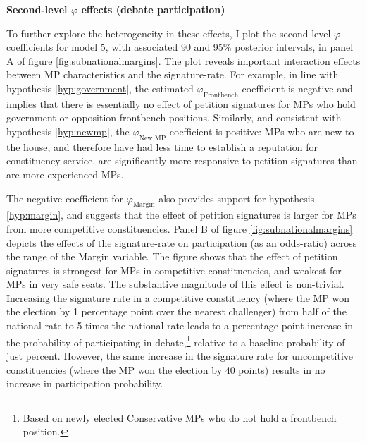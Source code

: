 \documentclass[12pt]{article}
\begin{document}
\begin{table}

\begin{center}



\end{center}
\caption{\label{tab:part_results}\textbf{Second-level $\varphi$ effects (debate participation)} }

\end{table}


To further explore the heterogeneity in these effects, I plot the second-level $\varphi$ coefficients for model 5, with associated 90 and 95\% posterior intervals, in panel A of figure \ref{fig:subnationalmargins}. The plot reveals important interaction effects between MP characteristics and the signature-rate. For example, in line with hypothesis \ref{hyp:government}, the estimated $\varphi_\text{Frontbench}$ coefficient is negative and implies that there is essentially no effect of petition signatures for MPs who hold government or opposition frontbench positions. Similarly, and consistent with hypothesis \ref{hyp:newmp}, the $\varphi_\text{New MP}$ coefficient is positive: MPs who are new to the house, and therefore have had less time to establish a reputation for constituency service, are significantly more responsive to petition signatures than are more experienced MPs. 

The negative coefficient for $\varphi_\text{Margin}$ also provides support for hypothesis \ref{hyp:margin}, and suggests that the effect of petition signatures is larger for MPs from more competitive constituencies. Panel B of figure \ref{fig:subnationalmargins} depicts the effects of the signature-rate on participation (as an odds-ratio) across the range of the Margin variable. The figure shows that the effect of petition signatures is strongest for MPs in competitive constituencies, and weakest for MPs in very safe seats. The substantive magnitude of this effect is non-trivial. Increasing the signature rate in a competitive constituency (where the MP won the election by 1 percentage point over the nearest challenger) from half of the national rate to 5 times the national rate leads to a percentage point increase in the probability of participating in debate,\footnote{Based on newly elected Conservative MPs who do not hold a frontbench position.} relative to a baseline probability of just percent. However, the same increase in the signature rate for uncompetitive constituencies (where the MP won the election by 40 points) results in no increase in participation probability. 
\end{document}

